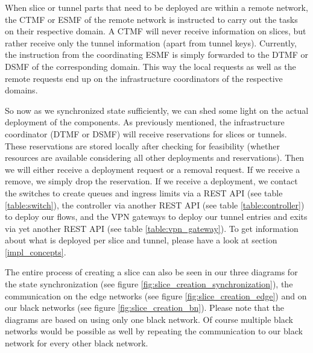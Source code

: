 When slice or tunnel parts that need to be deployed are within a remote network, the CTMF or ESMF of the remote network is instructed to carry out the tasks on their respective domain. A CTMF will never receive information on slices, but rather receive only the tunnel information (apart from tunnel keys). Currently, the instruction from the coordinating ESMF is simply forwarded to the DTMF or DSMF of the corresponding domain. This way the local requests as well as the remote requests end up on the infrastructure coordinators of the respective domains.

So now as we synchronized state sufficiently, we can shed some light on the actual deployment of the components. As previously mentioned, the infrastructure coordinator (DTMF or DSMF) will receive reservations for slices or tunnels. These reservations are stored locally after checking for feasibility (whether resources are available considering all other deployments and reservations). Then we will either receive a deployment request or a removal request. If we receive a remove, we simply drop the reservation. If we receive a deployment, we contact the switches to create queues and ingress limits via a REST API (see table \ref{table:switch}), the controller via another REST API (see table \ref{table:controller}) to deploy our flows, and the VPN gateways to deploy our tunnel entries and exits via yet another REST API (see table \ref{table:vpn_gateway}). To get information about what is deployed per slice and tunnel, please have a look at section \ref{impl_concepts}.

The entire process of creating a slice can also be seen in our three diagrams for the state synchronization (see figure \ref{fig:slice_creation_synchronization}), the communication on the edge networks (see figure \ref{fig:slice_creation_edge}) and on our black networks (see figure \ref{fig:slice_creation_bn}). Please note that the diagrams are based on using only one black network. Of course multiple black networks would be possible as well by repeating the communication to our black network for every other black network.


